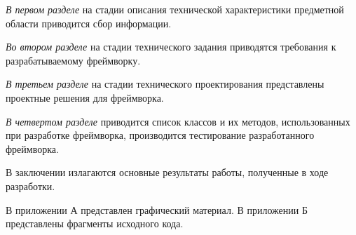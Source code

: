 \emph{В первом разделе} на стадии описания технической характеристики предметной области приводится сбор информации.

\emph{Во втором разделе} на стадии технического задания приводятся требования к разрабатываемому фреймворку.

\emph{В третьем разделе} на стадии технического проектирования представлены проектные решения для фреймворка.

\emph{В четвертом разделе} приводится список классов и их методов, использованных при разработке фреймворка, производится тестирование разработанного фреймворка.

В заключении излагаются основные результаты работы, полученные в ходе разработки.

В приложении А представлен графический материал.
В приложении Б представлены фрагменты исходного кода. 
